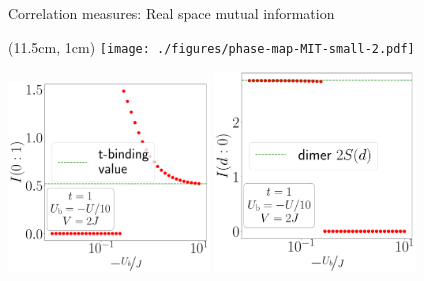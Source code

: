 \documentclass[aspectratio=169]{beamer}
\begin{document}
\begin{frame}[noframenumbering]{Correlation measures: Real space mutual information}
\begin{textblock*}{0.3\textwidth}(11.5cm, 1cm)
	\texttt{[image: ./figures/phase-map-MIT-small-2.pdf]}
\end{textblock*}

\vspace*{50pt}
\includegraphics[width=0.4\textwidth]{./figures/mi-01-t=1.000,J=10.000,0.000,40,V=3J,Ubath=-U_by_10,N=4,U=1.000,1000.000,40.pdf}
\includegraphics[width=0.4\textwidth]{./figures/mi-d0-t=1.000,J=10.000,0.000,40,V=3J,Ubath=-U_by_10,N=4,U=1.000,1000.000,40.pdf}
\end{frame}
\end{document}
